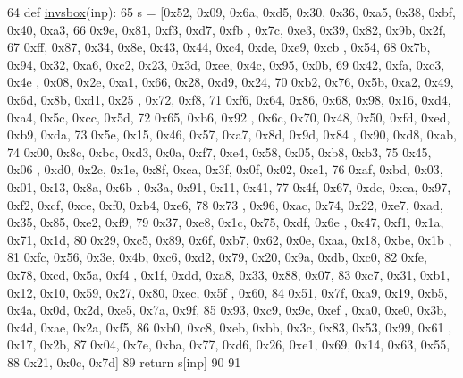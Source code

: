 \begin{DoxyCode}
64 \textcolor{keyword}{def }\hyperlink{namespacesoftware_1_1chipwhisperer_1_1analyzer_1_1models_1_1aes_1_1key__schedule_ac3f402095947072f7133ff28c1b0e0ed}{invsbox}(inp):
65     s = [0x52, 0x09, 0x6a, 0xd5, 0x30, 0x36, 0xa5, 0x38, 0xbf, 0x40, 0xa3,
66             0x9e, 0x81, 0xf3, 0xd7, 0xfb , 0x7c, 0xe3, 0x39, 0x82, 0x9b, 0x2f,
67             0xff, 0x87, 0x34, 0x8e, 0x43, 0x44, 0xc4, 0xde, 0xe9, 0xcb , 0x54,
68             0x7b, 0x94, 0x32, 0xa6, 0xc2, 0x23, 0x3d, 0xee, 0x4c, 0x95, 0x0b,
69             0x42, 0xfa, 0xc3, 0x4e , 0x08, 0x2e, 0xa1, 0x66, 0x28, 0xd9, 0x24,
70             0xb2, 0x76, 0x5b, 0xa2, 0x49, 0x6d, 0x8b, 0xd1, 0x25 , 0x72, 0xf8,
71             0xf6, 0x64, 0x86, 0x68, 0x98, 0x16, 0xd4, 0xa4, 0x5c, 0xcc, 0x5d,
72             0x65, 0xb6, 0x92 , 0x6c, 0x70, 0x48, 0x50, 0xfd, 0xed, 0xb9, 0xda,
73             0x5e, 0x15, 0x46, 0x57, 0xa7, 0x8d, 0x9d, 0x84 , 0x90, 0xd8, 0xab,
74             0x00, 0x8c, 0xbc, 0xd3, 0x0a, 0xf7, 0xe4, 0x58, 0x05, 0xb8, 0xb3,
75             0x45, 0x06 , 0xd0, 0x2c, 0x1e, 0x8f, 0xca, 0x3f, 0x0f, 0x02, 0xc1,
76             0xaf, 0xbd, 0x03, 0x01, 0x13, 0x8a, 0x6b , 0x3a, 0x91, 0x11, 0x41,
77             0x4f, 0x67, 0xdc, 0xea, 0x97, 0xf2, 0xcf, 0xce, 0xf0, 0xb4, 0xe6,
78             0x73 , 0x96, 0xac, 0x74, 0x22, 0xe7, 0xad, 0x35, 0x85, 0xe2, 0xf9,
79             0x37, 0xe8, 0x1c, 0x75, 0xdf, 0x6e , 0x47, 0xf1, 0x1a, 0x71, 0x1d,
80             0x29, 0xc5, 0x89, 0x6f, 0xb7, 0x62, 0x0e, 0xaa, 0x18, 0xbe, 0x1b ,
81             0xfc, 0x56, 0x3e, 0x4b, 0xc6, 0xd2, 0x79, 0x20, 0x9a, 0xdb, 0xc0,
82             0xfe, 0x78, 0xcd, 0x5a, 0xf4 , 0x1f, 0xdd, 0xa8, 0x33, 0x88, 0x07,
83             0xc7, 0x31, 0xb1, 0x12, 0x10, 0x59, 0x27, 0x80, 0xec, 0x5f , 0x60,
84             0x51, 0x7f, 0xa9, 0x19, 0xb5, 0x4a, 0x0d, 0x2d, 0xe5, 0x7a, 0x9f,
85             0x93, 0xc9, 0x9c, 0xef , 0xa0, 0xe0, 0x3b, 0x4d, 0xae, 0x2a, 0xf5,
86             0xb0, 0xc8, 0xeb, 0xbb, 0x3c, 0x83, 0x53, 0x99, 0x61 , 0x17, 0x2b,
87             0x04, 0x7e, 0xba, 0x77, 0xd6, 0x26, 0xe1, 0x69, 0x14, 0x63, 0x55,
88             0x21, 0x0c, 0x7d]
89     \textcolor{keywordflow}{return} s[inp]
90 
91 
\end{DoxyCode}
\hypertarget{namespacesoftware_1_1chipwhisperer_1_1analyzer_1_1models_1_1aes_1_1key__schedule_aa0e0cef2bfba47599cd9fdaed40e4c5c}{}
